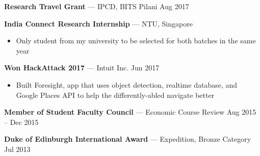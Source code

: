 \documentclass[10pt]{article}
\newenvironment{innerlist}[1][\enskip\textbullet]%
        {\begin{itemize}[#1,leftmargin=*,parsep=0pt,itemsep=0pt,topsep=0pt,partopsep=0pt]}
        {\end{itemize}}
\newcommand{\halfblankline}{\quad\vspace{-0.5\baselineskip}\pagebreak[3]}
\begin{document}
\halfblankline

\textbf{Research Travel Grant} --- IPCD, BITS Pilani \hfill Aug 2017

\halfblankline

\textbf{India Connect Research Internship} --- NTU, Singapore
\begin{innerlist}
\item[] Only student from my university to be selected for both batches in the same year
\end{innerlist}

\halfblankline

\textbf{Won HackAttack 2017} --- Intuit Inc. \hfill Jun 2017
\begin{innerlist}
\item[] Built Foresight, app that uses object detection, realtime database, and Google Places API to help the differently-abled navigate better
\end{innerlist}

\halfblankline

\textbf{Member of Student Faculty Council} --- Economic Course Review \hfill Aug 2015 -- Dec 2015

\halfblankline

\textbf{Duke of Edinburgh International Award} --- Expedition, Bronze Category \hfill Jul 2013
\end{document}
